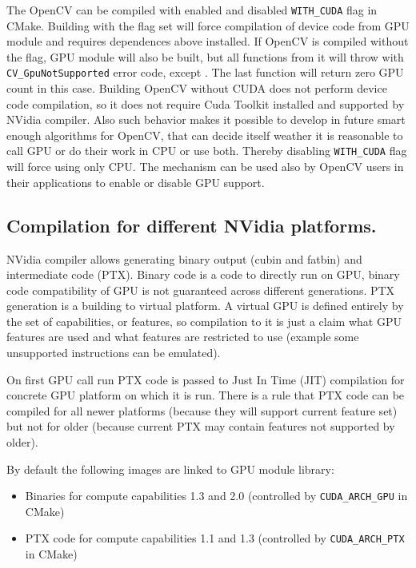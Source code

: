 The OpenCV can be compiled with enabled and disabled \texttt{WITH\_CUDA} flag in CMake. Building with the flag set will force compilation of device code from GPU module and requires dependences above installed. If OpenCV is compiled without the flag, GPU module will also be built, but all functions from it will throw  with \texttt{CV\_GpuNotSupported} error code, except . The last function will return zero GPU count in this case.  Building OpenCV without CUDA does not perform device code compilation, so it does not require Cuda Toolkit installed and supported by NVidia compiler. Also such behavior makes it possible to develop in future smart enough algorithms for OpenCV, that can decide itself weather it is reasonable to call GPU or do their work in CPU or use both. Thereby disabling \texttt{WITH\_CUDA} flag will force using only CPU. The mechanism can be used also by OpenCV users in their applications to enable or disable GPU support.

\subsection{Compilation for different NVidia platforms.}

NVidia compiler allows generating binary output (cubin and fatbin) and intermediate code (PTX). Binary code is a code to directly run on GPU, binary code compatibility of GPU is not guaranteed across different generations. PTX generation is a building to virtual platform. A virtual GPU is defined entirely by the set of capabilities, or features, so compilation to it is just a claim what GPU features are used and what features are restricted to use (example some unsupported instructions can be emulated).

On first GPU call run PTX code is passed to Just In Time (JIT) compilation for concrete GPU platform on which it is run. There is a rule that PTX code can be compiled for all newer platforms (because they will support current feature set) but not for older (because current PTX may contain features not supported by older). 

By default the following images are linked to GPU module library:
\begin{itemize}
\item Binaries for compute capabilities 1.3 and 2.0 (controlled by \texttt{CUDA\_ARCH\_GPU} in CMake)
\item PTX code for compute capabilities 1.1 and 1.3 (controlled by \texttt{CUDA\_ARCH\_PTX} in CMake)
\end{itemize}

